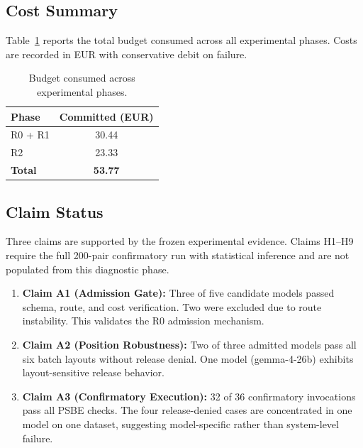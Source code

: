 \subsection{Cost Summary}

Table~\ref{tab:cost_summary} reports the total budget consumed across all
experimental phases. Costs are recorded in EUR with conservative debit on
failure.

\begin{table}[t]
\centering
\caption{Budget consumed across experimental phases.}
\label{tab:cost_summary}
\small
\begin{tabular}{lc}
\toprule
Phase & Committed (EUR) \\
\midrule
R0 + R1 & 30.44 \\
R2 & 23.33 \\
\midrule
\textbf{Total} & \textbf{53.77} \\
\bottomrule
\end{tabular}
\end{table}

\subsection{Claim Status}

Three claims are supported by the frozen experimental evidence. Claims
H1--H9 require the full 200-pair confirmatory run with statistical inference
and are not populated from this diagnostic phase.

\begin{enumerate}
\item \textbf{Claim A1 (Admission Gate):} Three of five candidate models
      passed schema, route, and cost verification. Two were excluded due to
      route instability. This validates the R0 admission mechanism.
\item \textbf{Claim A2 (Position Robustness):} Two of three admitted models
      pass all six batch layouts without release denial. One model
      (gemma-4-26b) exhibits layout-sensitive release behavior.
\item \textbf{Claim A3 (Confirmatory Execution):} 32 of 36 confirmatory
      invocations pass all PSBE checks. The four release-denied cases are
      concentrated in one model on one dataset, suggesting model-specific
      rather than system-level failure.
\end{enumerate}
